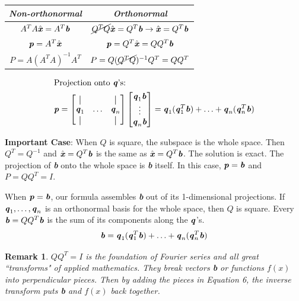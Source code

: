 \documentclass[12pt, letterpaper]{article}
\newcommand{\V}[1]{\textbf{\textit{#1}}}
\newtheorem*{remark}{Remark}
\theoremstyle{definition}
\newcommand*{\vertbar}{\rule[-1ex]{0.5pt}{2.5ex}}
\begin{document}
	\begin{center}
		{\renewcommand{\arraystretch}{1.2}
			\begin{tabular}{|c|c|}
				\hline
				\textit{Non-orthonormal} & \textit{Orthonormal} \\
				\hline
				$A^T A \hat{\V{x}} = A^T \V{b}$ & $\cancel{Q^T Q} \hat{\V{x}} = Q^T \V{b} \rightarrow \hat{\V{x}} = Q^T \V{b}$\\ 
				$\V{p} = A^T \hat{\V{x}}$ & $\V{p} = Q^T \hat{\V{x}} = QQ^T \V{b}$ \\
				$P = A (A^T A)^{-1}A^T$ & $P = Q (\cancel{Q^T Q})^{-1}Q^T = QQ^T$\\
				\hline
		\end{tabular}}
	\end{center}

	\begin{gather*}
		\intertext{Projection onto $\V{q}$'s:}
			\V{p} = \begin{bmatrix}
					\vertbar &  & \vertbar \\ 
					\V{q}_1 & \ldots & \V{q}_n\\ 
					\vertbar &  & \vertbar \\ 
					\end{bmatrix} \begin{bmatrix}
										\V{q}_1 \V{b}\\ 
										\vdots \\ 
										\V{q}_n \V{b} 
										\end{bmatrix} = \V{q}_1(\V{q}_1^T \V{b}) + \ldots + \V{q}_n(\V{q}_n^T \V{b})
	\end{gather*}
	
	\textbf{Important Case}: When $Q$ is square, the subspace is the whole space. Then $Q^T = Q^{-1}$ and $\hat{\V{x}} = Q^T \V{b}$ is the same as $\hat{\V{x}} = Q^T \V{b}$. The solution is exact. The projection of \V{b} onto the whole space is \V{b} itself. In this case, $\V{p} = \V{b}$ and $P = Q Q^T = I$.
	
	When $\V{p} = \V{b}$, our formula assembles \V{b} out of its 1-dimensional projections. If $\V{q}_1, \ldots, \V{q}_n$ is an orthonormal basis for the whole space, then $Q$ is square. Every $\V{b} = Q Q^T \V{b}$ is the sum of its components along the $\V{q}$'s.
		\begin{equation}
			\V{b} = \V{q}_1 (\V{q}_1^T \V{b}) + \ldots + \V{q}_n (\V{q}_n^T \V{b})
		\end{equation}
	\begin{remark}
		$QQ^T = I$ is the foundation of Fourier series and all great ``transforms" of applied mathematics. They break vectors \V{b} or functions $f(x)$ into perpendicular pieces. Then by adding the pieces in Equation 6, the inverse transform puts \V{b} and $f(x)$ back together.
	\end{remark}
\end{document}
